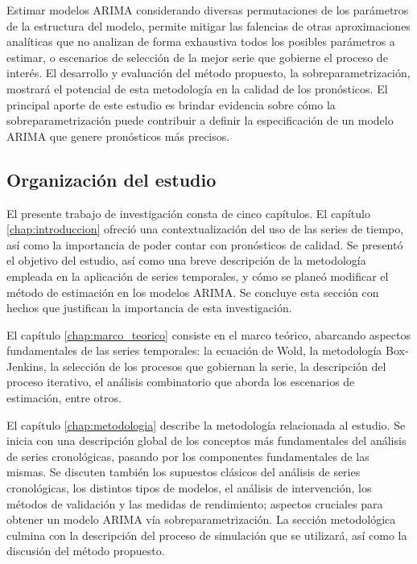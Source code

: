 \documentclass[
]{article}
\begin{document}
Estimar modelos ARIMA considerando diversas permutaciones de los
parámetros de la estructura del modelo, permite mitigar las falencias de
otras aproximaciones analíticas que no analizan de forma exhaustiva
todos los posibles parámetros a estimar, o escenarios de selección de la
mejor serie que gobierne el proceso de interés. El desarrollo y
evaluación del método propuesto, la sobreparametrización, mostrará el
potencial de esta metodología en la calidad de los pronósticos. El
principal aporte de este estudio es brindar evidencia sobre cómo la
sobreparametrización puede contribuir a definir la especificación de un
modelo ARIMA que genere pronósticos más precisos.

\subsection{Organización del estudio}

El presente trabajo de investigación consta de cinco capítulos. El
capítulo \ref{chap:introduccion} ofreció una contextualización del uso
de las series de tiempo, así como la importancia de poder contar con
pronósticos de calidad. Se presentó el objetivo del estudio, así como
una breve descripción de la metodología empleada en la aplicación de
series temporales, y cómo se planeó modificar el método de estimación en
los modelos ARIMA. Se concluye esta sección con hechos que justifican la
importancia de esta investigación.

El capítulo \ref{chap:marco_teorico} consiste en el marco teórico,
abarcando aspectos fundamentales de las series temporales: la ecuación
de Wold, la metodología Box-Jenkins, la selección de los procesos que
gobiernan la serie, la descripción del proceso iterativo, el análisis
combinatorio que aborda los escenarios de estimación, entre otros.

El capítulo \ref{chap:metodologia} describe la metodología relacionada
al estudio. Se inicia con una descripción global de los conceptos más
fundamentales del análisis de series cronológicas, pasando por los
componentes fundamentales de las mismas. Se discuten también los
supuestos clásicos del análisis de series cronológicas, los distintos
tipos de modelos, el análisis de intervención, los métodos de validación
y las medidas de rendimiento; aspectos cruciales para obtener un modelo
ARIMA vía sobreparametrización. La sección metodológica culmina con la
descripción del proceso de simulación que se utilizará, así como la
discusión del método propuesto.
\end{document}
